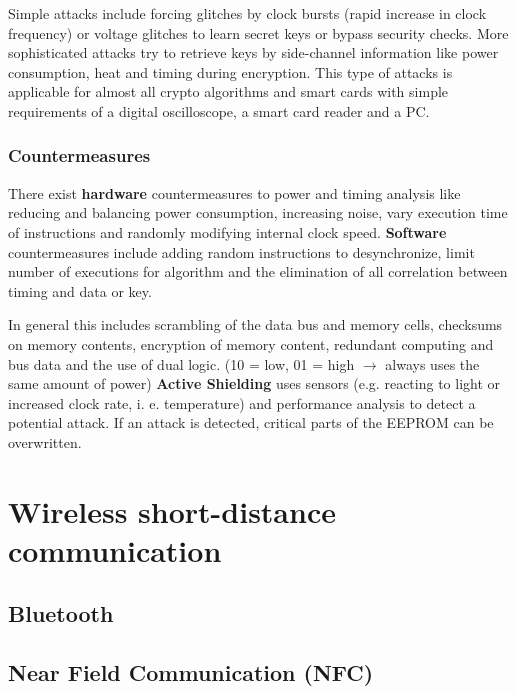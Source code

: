 \documentclass{article}
\begin{document}
\begin{multicols}{2}
Simple attacks include forcing glitches by clock bursts (rapid increase in
clock frequency) or voltage glitches to learn secret keys or bypass security
checks. More sophisticated attacks try to retrieve keys by side-channel
information like power consumption, heat and timing during encryption. This type
of attacks is applicable for almost all crypto algorithms and smart cards with
simple requirements of a digital oscilloscope, a smart card reader and a PC.

\subsubsection{Countermeasures}

There exist {\bf hardware} countermeasures to power and timing analysis like
reducing and balancing power consumption, increasing noise, vary execution time
of instructions and randomly modifying internal clock speed. {\bf Software}
countermeasures include adding random instructions to desynchronize, limit
number of executions for algorithm and the elimination of all correlation
between timing and data or key.

In general this includes scrambling of the data bus and memory cells, checksums
on memory contents, encryption of memory content, redundant computing and bus
data and the use of dual logic. (10 = low, 01 = high $\rightarrow$ always uses the same amount of
power) {\bf Active Shielding} uses sensors (e.g. reacting to light or increased
clock rate, i. e. temperature) and performance analysis to detect a potential
attack. If an attack is detected, critical parts of the EEPROM can be
overwritten.

\section{Wireless short-distance communication}

\subsection{Bluetooth}

\subsection{Near Field Communication (NFC)}


\clearpage
\end{multicols}
\end{document}
